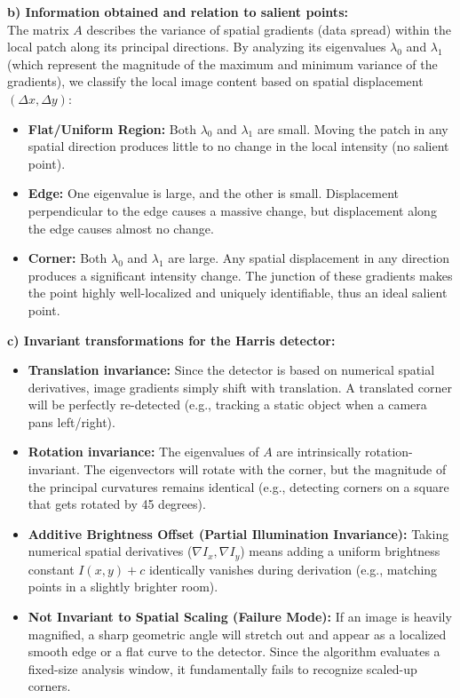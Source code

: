 {\textbf{b) Information obtained and relation to salient points:}
\\
The matrix $A$ describes the variance of spatial gradients (data spread) within the local patch along its principal directions. By analyzing its eigenvalues $\lambda_0$ and $\lambda_1$ (which represent the magnitude of the maximum and minimum variance of the gradients), we classify the local image content based on spatial displacement $(\Delta x, \Delta y)$:
\begin{itemize}
    \item \textbf{Flat/Uniform Region:} Both $\lambda_0$ and $\lambda_1$ are small. Moving the patch in any spatial direction produces little to no change in the local intensity (no salient point).
    \item \textbf{Edge:} One eigenvalue is large, and the other is small. Displacement perpendicular to the edge causes a massive change, but displacement along the edge causes almost no change.
    \item \textbf{Corner:} Both $\lambda_0$ and $\lambda_1$ are large. Any spatial displacement in any direction produces a significant intensity change. The junction of these gradients makes the point highly well-localized and uniquely identifiable, thus an ideal salient point.
\end{itemize}

\textbf{c) Invariant transformations for the Harris detector:}
\\
\begin{itemize}
    \item \textbf{Translation invariance:} Since the detector is based on numerical spatial derivatives, image gradients simply shift with translation. A translated corner will be perfectly re-detected (e.g., tracking a static object when a camera pans left/right).
    \item \textbf{Rotation invariance:} The eigenvalues of $A$ are intrinsically rotation-invariant. The eigenvectors will rotate with the corner, but the magnitude of the principal curvatures remains identical (e.g., detecting corners on a square that gets rotated by 45 degrees).
    \item \textbf{Additive Brightness Offset (Partial Illumination Invariance):} Taking numerical spatial derivatives ($\nabla I_x, \nabla I_y$) means adding a uniform brightness constant $I(x,y) + c$ identically vanishes during derivation (e.g., matching points in a slightly brighter room).
    \item \textbf{Not Invariant to Spatial Scaling (Failure Mode):} If an image is heavily magnified, a sharp geometric angle will stretch out and appear as a localized smooth edge or a flat curve to the detector. Since the algorithm evaluates a fixed-size analysis window, it fundamentally fails to recognize scaled-up corners.
\end{itemize}
}

